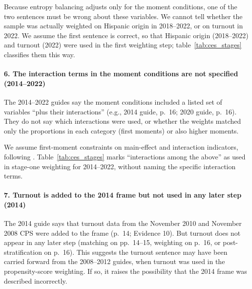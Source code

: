 \documentclass[12pt]{article}
\begin{document}

Because entropy balancing adjusts only for the moment conditions, one of the two sentences must be wrong about these variables. We cannot tell whether the sample was actually weighted on Hispanic origin in 2018--2022, or on turnout in 2022. We assume the first sentence is correct, so that Hispanic origin (2018--2022) and turnout (2022) were used in the first weighting step; table~\ref{tab:ces_stages} classifies them this way.

\paragraph*{6. The interaction terms in the moment conditions are not specified (2014--2022)}
The 2014--2022 guides say the moment conditions included a listed set of variables ``plus their interactions'' (e.g., 2014 guide, p.~16; 2020 guide, p.~16). They do not say which interactions were used, or whether the weights matched only the proportions in each category (first moments) or also higher moments.

We assume first-moment constraints on main-effect and interaction indicators, following \textcite{hainmueller_entropy_2012}. Table~\ref{tab:ces_stages} marks ``interactions among the above'' as used in stage-one weighting for 2014--2022, without naming the specific interaction terms.

\paragraph*{7. Turnout is added to the 2014 frame but not used in any later step (2014)}
The 2014 guide says that turnout data from the November 2010 and November 2008 CPS were added to the frame (p.~14; Evidence 10). But turnout does not appear in any later step (matching on pp.~14--15, weighting on p.~16, or post-stratification on p.~16). This suggests the turnout sentence may have been carried forward from the 2008--2012 guides, when turnout was used in the propensity-score weighting. If so, it raises the possibility that the 2014 frame was described incorrectly.

\end{document}
